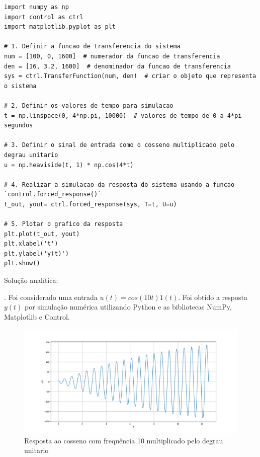 \documentclass[10pt]{article}
\begin{document}
\begin{lstlisting}
import numpy as np
import control as ctrl
import matplotlib.pyplot as plt

# 1. Definir a funcao de transferencia do sistema
num = [100, 0, 1600]  # numerador da funcao de transferencia
den = [16, 3.2, 1600]  # denominador da funcao de transferencia
sys = ctrl.TransferFunction(num, den)  # criar o objeto que representa o sistema

# 2. Definir os valores de tempo para simulacao
t = np.linspace(0, 4*np.pi, 10000)  # valores de tempo de 0 a 4*pi segundos

# 3. Definir o sinal de entrada como o cosseno multiplicado pelo degrau unitario
u = np.heaviside(t, 1) * np.cos(4*t)

# 4. Realizar a simulacao da resposta do sistema usando a funcao `control.forced_response()`
t_out, yout= ctrl.forced_response(sys, T=t, U=u)

# 5. Plotar o grafico da resposta
plt.plot(t_out, yout)
plt.xlabel('t')
plt.ylabel('y(t)')
plt.show()
\end{lstlisting}

\quad Solução analítica:

\newpage

. Foi considerado uma entrada $u(t) = cos(10 t) 1(t)$. Foi obtido a resposta $y(t)$ por simulação numérica utilizando Python
e as bibliotecas NumPy, Matplotlib e Control.

\begin{figure}[h]
    \centering
    \includegraphics[scale=0.45]{questao3.png}
    \caption{Resposta ao cosseno com frequência 10 multiplicado pelo degrau unitario}
\end{figure}
\end{document}
